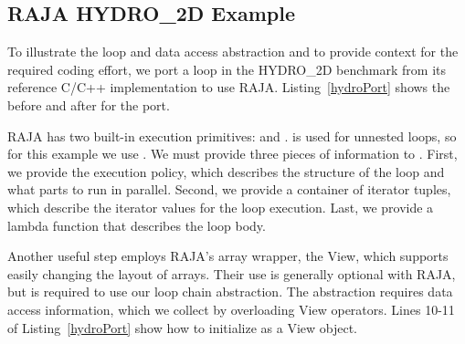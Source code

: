 \subsection{RAJA HYDRO\_2D Example}

To illustrate the loop and data access abstraction and to provide context
for the required coding effort, we port a loop in the HYDRO\_2D benchmark
from its reference C/C++ implementation to use RAJA.
Listing~\ref{hydroPort} shows the before and after for the port.

RAJA has two built-in execution primitives:  and .
 is used for unnested loops, so for this example we use
.
We must provide three pieces of information to . 
First, we provide the execution policy, which describes the structure of
the loop and what parts to run in parallel.
Second, we provide a container of iterator tuples, which describe the
iterator values for the loop execution.
Last, we provide a lambda function that describes the loop body.

Another useful step employs RAJA's array wrapper, the View, which supports
easily changing the layout of arrays.
Their use is generally optional with RAJA, but is required to use our loop
chain abstraction.
The abstraction requires data access information, which we collect by
overloading View operators.
Lines 10-11 of Listing~\ref{hydroPort} show how to initialize 
as a View object.





